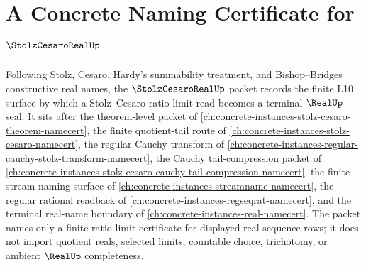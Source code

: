 \chapter{A Concrete Naming Certificate for $\StolzCesaroRealUp$}
\label{ch:concrete-instances-stolz-cesaro-real-namecert}

Following Stolz, Cesaro, Hardy's summability treatment, and Bishop--Bridges constructive real names, the $\StolzCesaroRealUp$ packet records the finite L10 surface by which a Stolz--Cesaro ratio-limit read becomes a terminal $\RealUp$ seal. It sits after the theorem-level packet of \autoref{ch:concrete-instances-stolz-cesaro-theorem-namecert}, the finite quotient-tail route of \autoref{ch:concrete-instances-stolz-cesaro-namecert}, the regular Cauchy transform of \autoref{ch:concrete-instances-regular-cauchy-stolz-transform-namecert}, the Cauchy tail-compression packet of \autoref{ch:concrete-instances-stolz-cesaro-cauchy-tail-compression-namecert}, the finite stream naming surface of \autoref{ch:concrete-instances-streamname-namecert}, the regular rational readback of \autoref{ch:concrete-instances-regseqrat-namecert}, and the terminal real-name boundary of \autoref{ch:concrete-instances-real-namecert}. The packet names only a finite ratio-limit certificate for displayed real-sequence rows; it does not import quotient reals, selected limits, countable choice, trichotomy, or ambient $\RealUp$ completeness.

